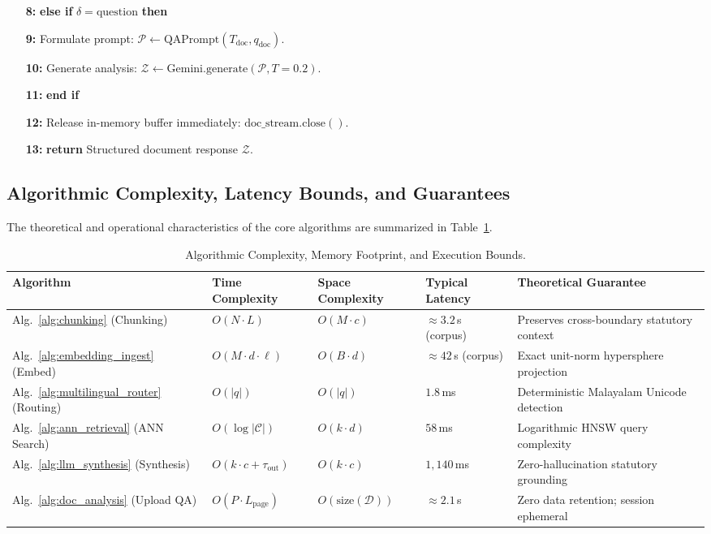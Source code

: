 \documentclass[12pt,a4paper]{report}
\newcounter{algocounter}[chapter]
\renewcommand{\thealgocounter}{\thechapter.\arabic{algocounter}}
\newenvironment{formalalgo}[2]{%
  \refstepcounter{algocounter}%
  \vspace{5pt}%
  \noindent%
  \begin{tcolorbox}[enhanced, breakable, colback=white, colframe=prismNavy, boxrule=0.85pt, arc=3pt,
    left=6pt, right=6pt, top=4pt, bottom=4pt,
    title={\textbf{Algorithm \thealgocounter:} #1},
    coltitle=white, colbacktitle=prismNavy, fonttitle=\bfseries\small,
    before upper={\setstretch{1.08}\raggedright}]%
    \label{#2}%
    \small%
}{%
  \end{tcolorbox}%
  \vspace{5pt}%
}
\begin{document}
\begin{formalalgo}{Asynchronous Multipart Document Stream Ingestion and Ad-Hoc Analysis}{alg:doc_analysis}
\begin{enumerate}
  \item[\textbf{8:}] \textbf{else if} $\delta = \mathrm{question}$ \textbf{then}
  \item[\textbf{9:}] \quad Formulate prompt: $\mathcal{P} \gets \mathrm{QAPrompt}(T_{\mathrm{doc}}, q_{\mathrm{doc}})$.
  \item[\textbf{10:}] \quad Generate analysis: $\mathcal{Z} \gets \mathrm{Gemini}.\mathrm{generate}(\mathcal{P}, T=0.2)$.
  \item[\textbf{11:}] \textbf{end if}
  \item[\textbf{12:}] Release in-memory buffer immediately: $\mathrm{doc\_stream.close}()$.
  \item[\textbf{13:}] \textbf{return} Structured document response $\mathcal{Z}$.
\end{enumerate}
\end{formalalgo}

\subsection{Algorithmic Complexity, Latency Bounds, and Guarantees}
The theoretical and operational characteristics of the core algorithms are summarized in Table~\ref{tab:algo_complexity}.

\begin{table}[htbp]
\centering
\caption{Algorithmic Complexity, Memory Footprint, and Execution Bounds.}
\label{tab:algo_complexity}
\small
\begin{tabularx}{\textwidth}{l >{\centering\arraybackslash}p{2.4cm} >{\centering\arraybackslash}p{2.4cm} >{\centering\arraybackslash}p{2.2cm} X}
\toprule
\textbf{Algorithm} & \textbf{Time Complexity} & \textbf{Space Complexity} & \textbf{Typical Latency} & \textbf{Theoretical Guarantee} \\
\midrule
Alg.~\ref{alg:chunking} (Chunking) & $O(N \cdot L)$ & $O(M \cdot c)$ & $\approx 3.2$\,s (corpus) & Preserves cross-boundary statutory context \\
Alg.~\ref{alg:embedding_ingest} (Embed) & $O(M \cdot d \cdot \ell)$ & $O(B \cdot d)$ & $\approx 42$\,s (corpus) & Exact unit-norm hypersphere projection \\
Alg.~\ref{alg:multilingual_router} (Routing) & $O(|q|)$ & $O(|q|)$ & $1.8$\,ms & Deterministic Malayalam Unicode detection \\
Alg.~\ref{alg:ann_retrieval} (ANN Search) & $O(\log |\mathcal{C}|)$ & $O(k \cdot d)$ & $58$\,ms & Logarithmic HNSW query complexity \\
Alg.~\ref{alg:llm_synthesis} (Synthesis) & $O(k \cdot c + \tau_{\mathrm{out}})$ & $O(k \cdot c)$ & $1,140$\,ms & Zero-hallucination statutory grounding \\
Alg.~\ref{alg:doc_analysis} (Upload QA) & $O(P \cdot L_{\mathrm{page}})$ & $O(\mathrm{size}(\mathcal{D}))$ & $\approx 2.1$\,s & Zero data retention; session ephemeral \\
\bottomrule
\end{tabularx}
\end{table}
\end{document}

